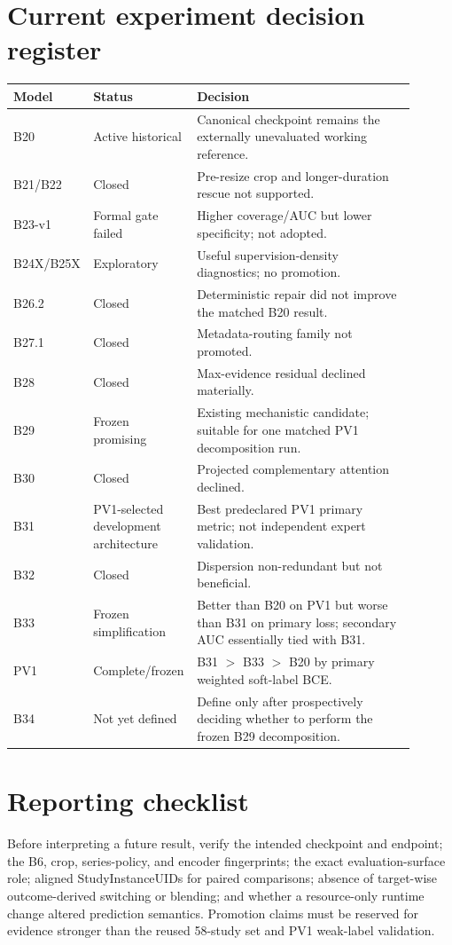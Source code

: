 \documentclass[preprint,12pt]{elsarticle}
\begin{document}
\section{Current experiment decision register}
\label{app:decisionregister}
\begin{longtable}{p{0.12\linewidth}p{0.24\linewidth}p{0.54\linewidth}}
\toprule
Model & Status & Decision \\
\midrule
B20 & Active historical & Canonical checkpoint remains the externally unevaluated working reference. \\
B21/B22 & Closed & Pre-resize crop and longer-duration rescue not supported. \\
B23-v1 & Formal gate failed & Higher coverage/AUC but lower specificity; not adopted. \\
B24X/B25X & Exploratory & Useful supervision-density diagnostics; no promotion. \\
B26.2 & Closed & Deterministic repair did not improve the matched B20 result. \\
B27.1 & Closed & Metadata-routing family not promoted. \\
B28 & Closed & Max-evidence residual declined materially. \\
B29 & Frozen promising & Existing mechanistic candidate; suitable for one matched PV1 decomposition run. \\
B30 & Closed & Projected complementary attention declined. \\
B31 & PV1-selected development architecture & Best predeclared PV1 primary metric; not independent expert validation. \\
B32 & Closed & Dispersion non-redundant but not beneficial. \\
B33 & Frozen simplification & Better than B20 on PV1 but worse than B31 on primary loss; secondary AUC essentially tied with B31. \\
PV1 & Complete/frozen & B31 $>$ B33 $>$ B20 by primary weighted soft-label BCE. \\
B34 & Not yet defined & Define only after prospectively deciding whether to perform the frozen B29 decomposition. \\
\bottomrule
\end{longtable}

\section{Reporting checklist}
Before interpreting a future result, verify the intended checkpoint and endpoint; the B6, crop, series-policy, and encoder fingerprints; the exact evaluation-surface role; aligned StudyInstanceUIDs for paired comparisons; absence of target-wise outcome-derived switching or blending; and whether a resource-only runtime change altered prediction semantics. Promotion claims must be reserved for evidence stronger than the reused 58-study set and PV1 weak-label validation.
\end{document}
